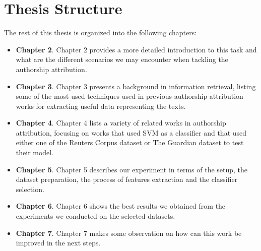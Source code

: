 \section{Thesis Structure}
The rest of this thesis is organized into the following chapters:
\begin{itemize}
	\item \textbf{Chapter 2}. Chapter 2 provides a more detailed introduction to this task and what are the different scenarios we may encounter when tackling the authorship attribution.
	\item \textbf{Chapter 3}. Chapter 3 presents a background in information retrieval, listing some of the most used techniques used in previous authorship attribution works for extracting useful data representing the texts.
	\item \textbf{Chapter 4}. Chapter 4 lists a variety of related works in authorship attribution, focusing on works that used SVM as a classifier and that used either one of the Reuters Corpus dataset or The Guardian dataset to test their model.
	\item \textbf{Chapter 5}. Chapter 5 describes our experiment in terms of the setup, the dataset preparation, the process of features extraction and the classifier selection.
	\item \textbf{Chapter 6}. Chapter 6 shows the best results we obtained from the experiments we conducted on the selected datasets.
	\item \textbf{Chapter 7}. Chapter 7 makes some observation on how can this work be improved in the next steps.
\end{itemize}